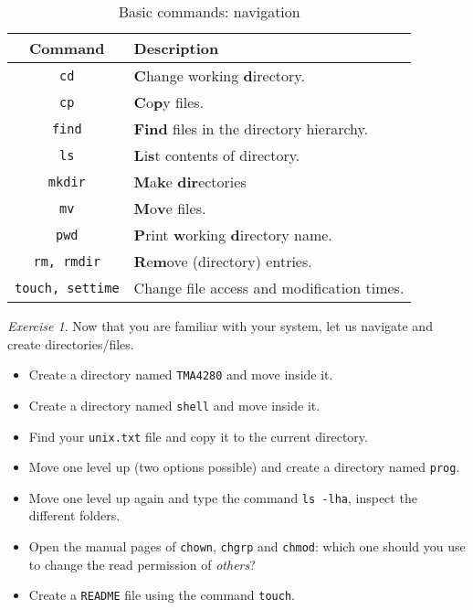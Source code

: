 \documentclass[onecolumn, oneside, a4paper, 11pt]{memoir}
\theoremstyle{remark}
\newtheorem{ex}{Exercise}
\begin{document}
\begin{table}[h!]
\centering
\caption{Basic commands: navigation}
\begin{tabular}{|c|l|}
  \hline
  Command & Description \\
  \hline
  \texttt{cd} & \textbf{C}hange working \textbf{d}irectory. \\
  \texttt{cp} & \textbf{C}o\textbf{p}y files. \\
  \texttt{find} & \textbf{Find} files in the directory hierarchy. \\
  \texttt{ls} & \textbf{L}i\textbf{s}t contents of directory. \\
  \texttt{mkdir} & \textbf{M}a\textbf{k}e \textbf{dir}ectories \\
  \texttt{mv} & \textbf{M}o\textbf{v}e files. \\
  \texttt{pwd} & \textbf{P}rint \textbf{w}orking \textbf{d}irectory name. \\
  \texttt{rm, rmdir} & \textbf{R}e\textbf{m}ove (directory) entries. \\
  \texttt{touch, settime} & Change file access and modification times. \\
  \hline
\end{tabular}
\end{table}

\begin{ex}
Now that you are familiar with your system, let us navigate and create directories/files.
\begin{itemize}
\item Create a directory named \texttt{TMA4280} and move inside it.
\item Create a directory named \texttt{shell} and move inside it.
\item Find your \texttt{unix.txt} file and copy it to the current directory.
\item Move one level up (two options possible) and create a directory named \texttt{prog}.
\item Move one level up again and type the command \texttt{ls -lha}, inspect the different folders.
\item Open the manual pages of \texttt{chown}, \texttt{chgrp} and \texttt{chmod}: which one should you use to change the read permission of \textit{others}?
\item Create a \texttt{README} file using the command \texttt{touch}.
\end{itemize}
\end{ex}
\end{document}
